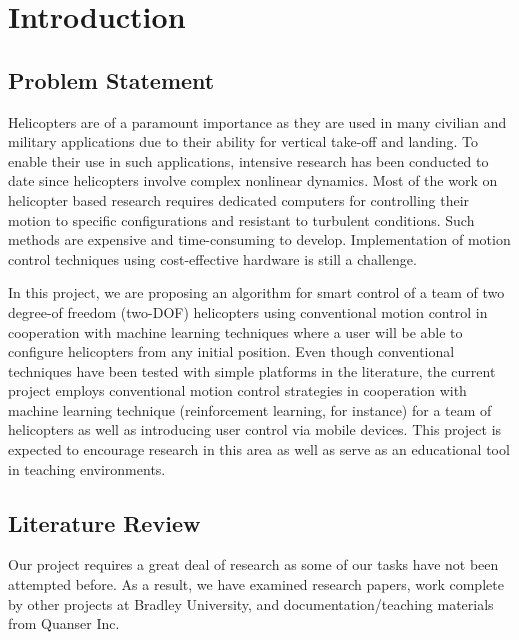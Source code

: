 \chapter{Introduction}
\label{ch: Chapter1}

\section{Problem Statement}
Helicopters are of a paramount importance as
they are used in many civilian and military applications due to their ability for vertical take-off and landing. To enable their use in such applications, intensive research has been conducted to date since helicopters involve complex nonlinear dynamics. Most of the work on helicopter based research requires dedicated computers for controlling their motion to specific configurations and resistant to turbulent conditions. Such methods are expensive and time-consuming to develop. Implementation of motion control techniques using cost-effective hardware is still a challenge.

In this project, we are proposing an algorithm for smart control of a team of two degree-of freedom (two-DOF) helicopters using conventional motion control in cooperation with machine learning techniques where a user will be able to configure helicopters from any initial position. Even though conventional techniques have been tested with simple platforms in the literature, the current project employs conventional motion control strategies in cooperation with machine learning technique (reinforcement learning, for instance) for a team of helicopters as well as introducing user control via mobile devices. This project is expected to encourage research in this area as well as serve as an educational tool in teaching environments.


\section{Literature Review}
Our project requires a great deal of research as some of our tasks have not been attempted before.  As a result, we have examined research papers, work complete by other projects at Bradley University, and documentation/teaching materials from Quanser Inc.

